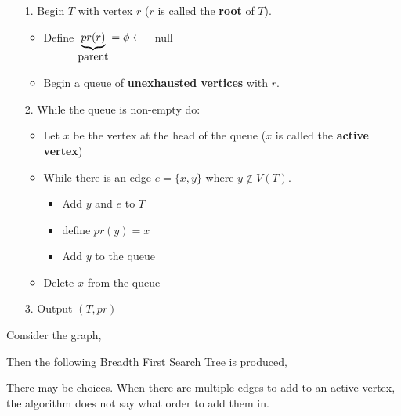 \documentclass[english, 11pt]{article}
\begin{document}
\begin{itemize}
  \item[1.] Begin $T$ with vertex $r$ ($r$ is called the \textbf{root} of $T$).
  \begin{itemize}
    \item Define $\underbrace{pr(r)}_{\mbox{parent}} = \phi \longleftarrow $ null
    \item Begin a queue of \textbf{unexhausted vertices} with $r$.
  \end{itemize}
  \item[2.] While the queue is non-empty do:
  \begin{itemize}
    \item Let $x$ be the vertex at the head of the queue ($x$ is called the \textbf{active vertex})
    \item While there is an edge $e = \{x,y\}$ where $y \not \in V(T)$.
    \begin{itemize}
      \item Add $y$ and $e$ to $T$
      \item define $pr(y) = x$
      \item Add $y$ to the queue
    \end{itemize}
    \item Delete $x$ from the queue
  \end{itemize}
  \item[3.] Output $(T, pr)$
\end{itemize}

\begin{exmp}
  Consider the graph,
  \begin{center}
\end{center}
\end{exmp}
Then the following Breadth First Search Tree is produced,
  \begin{center}
\end{center}
\begin{note}
  There may be choices. When there are multiple edges to add to an active vertex, the algorithm does not say what order to add them in.
\end{note}
\end{document}
